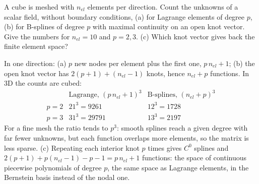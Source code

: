 \label{exo:dof-count}
%
A cube is meshed with $n_{el}$ elements per direction. Count the unknowns of
a scalar field, without boundary conditions, (a) for Lagrange elements of
degree $p$, (b) for B-splines of degree $p$ with maximal continuity on an
open knot vector. Give the numbers for $n_{el}=10$ and $p=2,3$. (c) Which knot
vector gives back the finite element space?
\begin{solution}
In one direction: (a) $p$ new nodes per element plus the first one,
$p\,n_{el}+1$; (b) the open knot vector has $2(p+1)+(n_{el}-1)$ knots, hence
$n_{el}+p$ functions. In 3D the counts are cubed:
\[
\begin{array}{lcc}
 & \text{Lagrange, }(p\,n_{el}+1)^3 & \text{B-splines, }(n_{el}+p)^3\\[2pt]
p=2 & 21^3=9261 & 12^3=1728\\
p=3 & 31^3=29791 & 13^3=2197
\end{array}
\]
For a fine mesh the ratio tends to $p^3$: smooth splines reach a given degree
with far fewer unknowns, but each function overlaps more elements, so the
matrix is less sparse. (c) Repeating each interior knot $p$ times gives $C^0$
splines and $2(p+1)+p(n_{el}-1)-p-1=p\,n_{el}+1$ functions: the space of
continuous piecewise polynomials of degree $p$, the same space as Lagrange
elements, in the Bernstein basis instead of the nodal one.
\end{solution}

